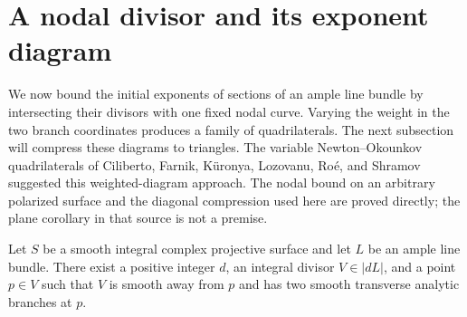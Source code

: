 \section{A nodal divisor and its exponent diagram}
\label{sec:node}

We now bound the initial exponents of sections of an ample line bundle by
intersecting their divisors with one fixed nodal curve.  Varying the weight
in the two branch coordinates produces a family of quadrilaterals.  The
next subsection will compress these diagrams to triangles.
The variable Newton--Okounkov quadrilaterals of Ciliberto, Farnik,
K{\"u}ronya, Lozovanu, Ro\'e, and Shramov
\cite[Section~5.1 and Corollary~5.8]{CFKLRS2016} suggested this
weighted-diagram approach.  The nodal bound on an arbitrary polarized
surface and the diagonal compression used here are proved directly;
the plane corollary in that source is not a premise.

\begin{lemma}
\label{lem:node}
Let $S$ be a smooth integral complex projective surface and let $L$ be an
ample line bundle.  There exist a positive integer $d$, an integral divisor
$V\in|dL|$, and a point $p\in V$ such that $V$ is smooth away from $p$ and
has two smooth transverse analytic branches at $p$.
\end{lemma}

